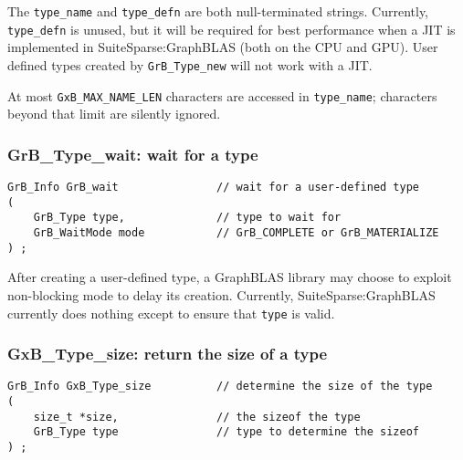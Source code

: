 \documentclass[12pt]{article}
\begin{document}
The \verb'type_name' and \verb'type_defn' are both null-terminated strings.
Currently, \verb'type_defn' is unused, but it will be required for best
performance when a JIT is implemented in SuiteSparse:GraphBLAS (both on the CPU
and GPU).  User defined types created by \verb'GrB_Type_new' will not work with
a JIT.

At most \verb'GxB_MAX_NAME_LEN' characters are accessed in \verb'type_name';
characters beyond that limit are silently ignored.

\subsubsection{{\sf GrB\_Type\_wait:} wait for a type}
\label{type_wait}

\begin{mdframed}[userdefinedwidth=6in]
{\footnotesize
\begin{verbatim}
GrB_Info GrB_wait               // wait for a user-defined type
(
    GrB_Type type,              // type to wait for
    GrB_WaitMode mode           // GrB_COMPLETE or GrB_MATERIALIZE
) ;
\end{verbatim}
}\end{mdframed}

After creating a user-defined type, a GraphBLAS library may choose to exploit
non-blocking mode to delay its creation.  Currently, SuiteSparse:GraphBLAS
currently does nothing except to ensure that \verb'type' is valid.

\subsubsection{{\sf GxB\_Type\_size:} return the size of a type}
\label{type_size}

\begin{mdframed}[userdefinedwidth=6in]
{\footnotesize
\begin{verbatim}
GrB_Info GxB_Type_size          // determine the size of the type
(
    size_t *size,               // the sizeof the type
    GrB_Type type               // type to determine the sizeof
) ;
\end{verbatim}
}\end{mdframed}
\end{document}
